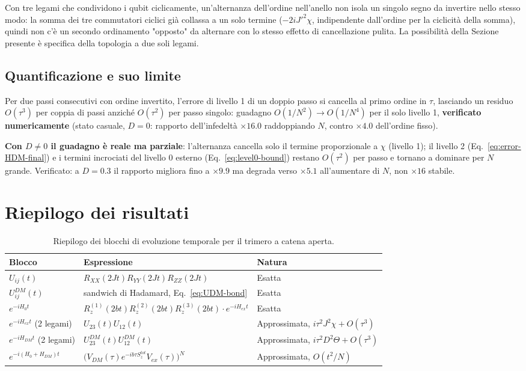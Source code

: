 \documentclass[11pt,a4paper]{article}
\begin{document}
Con tre legami che condividono i qubit ciclicamente, un'alternanza dell'ordine nell'anello non isola un singolo segno da invertire nello stesso modo: la somma dei tre commutatori ciclici già collassa a un solo termine ($-2iJ'^2\chi$, indipendente dall'ordine per la ciclicità della somma), quindi non c'è un secondo ordinamento "opposto" da alternare con lo stesso effetto di cancellazione pulita. La possibilità della Sezione presente è specifica della topologia a due soli legami.

\subsection{Quantificazione e suo limite}

Per due passi consecutivi con ordine invertito, l'errore di livello 1 di un doppio passo si cancella al primo ordine in $\tau$, lasciando un residuo $O(\tau^3)$ per coppia di passi anziché $O(\tau^2)$ per passo singolo: guadagno $O(1/N^2)\to O(1/N^4)$ per il solo livello 1, \textbf{verificato numericamente} (stato casuale, $D=0$: rapporto dell'infedeltà $\times16.0$ raddoppiando $N$, contro $\times4.0$ dell'ordine fisso).

\textbf{Con $D\neq0$ il guadagno è reale ma parziale}: l'alternanza cancella solo il termine proporzionale a $\chi$ (livello 1); il livello 2 (Eq.~\eqref{eq:error-HDM-final}) e i termini incrociati del livello 0 esterno (Eq.~\eqref{eq:level0-bound}) restano $O(\tau^2)$ per passo e tornano a dominare per $N$ grande. Verificato: a $D=0.3$ il rapporto migliora fino a $\times9.9$ ma degrada verso $\times5.1$ all'aumentare di $N$, non $\times16$ stabile.

\section{Riepilogo dei risultati}

\begin{table}[h]
\centering
\footnotesize
\begin{tabular}{@{}p{3.0cm}p{7.6cm}p{3.4cm}@{}}
\toprule
\textbf{Blocco} & \textbf{Espressione} & \textbf{Natura} \\
\midrule
$U_{ij}(t)$ & $R_{XX}(2Jt)R_{YY}(2Jt)R_{ZZ}(2Jt)$ & Esatta \\[4pt]
$U_{ij}^{DM}(t)$ & sandwich di Hadamard, Eq.~\ref{eq:UDM-bond} & Esatta \\[4pt]
$e^{-iH_0t}$ & $R_z^{(1)}(2bt)R_z^{(2)}(2bt)R_z^{(3)}(2bt)\cdot e^{-iH_{ex}t}$ & Esatta \\[4pt]
$e^{-iH_{ex}t}$ (2 legami) & $U_{23}(t)U_{12}(t)$ & Approssimata, $i\tau^2J^2\chi+O(\tau^3)$ \\[6pt]
$e^{-iH_{DM}t}$ (2 legami) & $U_{23}^{DM}(t)U_{12}^{DM}(t)$ & Approssimata, $i\tau^2D^2\Theta+O(\tau^3)$ \\[6pt]
$e^{-i(H_0+H_{DM})t}$ & $\big(V_{DM}(\tau)e^{-ib\tau S_z^{tot}}V_{ex}(\tau)\big)^N$ & Approssimata, $O(t^2/N)$ \\
\bottomrule
\end{tabular}
\caption{Riepilogo dei blocchi di evoluzione temporale per il trimero a catena aperta.}
\end{table}
\end{document}
